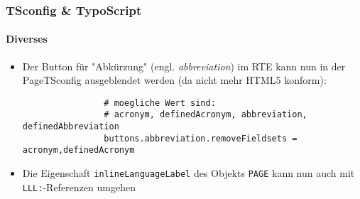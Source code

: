 \begin{frame}[fragile]
	\frametitle{TSconfig \& TypoScript}
	\framesubtitle{Diverses}

	\begin{itemize}
		\item Der Button für "Abkürzung" (engl. \textit{abbreviation}) im RTE kann nun
			in der PageTSconfig ausgeblendet werden (da nicht mehr HTML5 konform):

			\begin{lstlisting}
				# moegliche Wert sind:
				# acronym, definedAcronym, abbreviation, definedAbbreviation
				buttons.abbreviation.removeFieldsets = acronym,definedAcronym
			\end{lstlisting}

		\item Die Eigenschaft \texttt{inlineLanguageLabel} des Objekts \texttt{PAGE} kann nun
			auch mit \texttt{LLL:}-Referenzen umgehen

	\end{itemize}

\end{frame}

